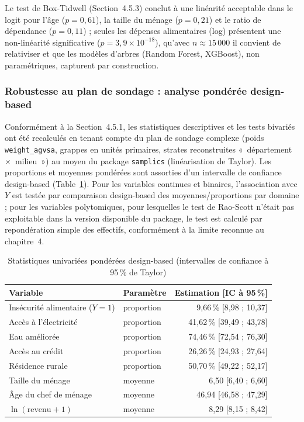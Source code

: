 Le test de Box-Tidwell (Section~4.5.3) conclut à une linéarité acceptable dans
le logit pour l'âge ($p = 0{,}61$), la taille du ménage ($p = 0{,}21$) et le
ratio de dépendance ($p = 0{,}11$) ; seules les dépenses alimentaires (log)
présentent une non-linéarité significative ($p = 3{,}9\times10^{-18}$),
qu'avec $n \approx 15\,000$ il convient de relativiser et que les modèles
d'arbres (Random Forest, XGBoost), non paramétriques, capturent par
construction.

\subsubsection{Robustesse au plan de sondage : analyse pondérée design-based}
\label{sssec:res-ponderee}

Conformément à la Section~4.5.1, les statistiques descriptives et les tests
bivariés ont été recalculés en tenant compte du plan de sondage complexe
(poids \texttt{weight\_agvsa}, grappes en unités primaires, strates
reconstruites «~département~$\times$~milieu~») au moyen du package
\texttt{samplics} (linéarisation de Taylor). Les proportions et moyennes
pondérées sont assorties d'un intervalle de confiance design-based
(Table~\ref{tab:res-pondere-uni}). Pour les variables continues et binaires,
l'association avec $Y$ est testée par comparaison design-based des
moyennes/proportions par domaine ; pour les variables polytomiques, pour
lesquelles le test de Rao-Scott n'était pas exploitable dans la version
disponible du package, le test est calculé par repondération simple des
effectifs, conformément à la limite reconnue au chapitre~4.

\begin{table}[H]
\centering
\caption{Statistiques univariées pondérées design-based (intervalles de confiance
à 95\,\% de Taylor)}
\label{tab:res-pondere-uni}
\small\setlength{\tabcolsep}{5pt}
\begin{tabular}{llr}
\toprule
\textbf{Variable} & \textbf{Paramètre} & \textbf{Estimation [IC à 95\,\%]} \\
\midrule
Insécurité alimentaire ($Y=1$) & proportion & 9,66\,\% [8,98 ; 10,37] \\
Accès à l'électricité          & proportion & 41,62\,\% [39,49 ; 43,78] \\
Eau améliorée                  & proportion & 74,46\,\% [72,54 ; 76,30] \\
Accès au crédit                & proportion & 26,26\,\% [24,93 ; 27,64] \\
Résidence rurale               & proportion & 50,70\,\% [49,22 ; 52,17] \\
Taille du ménage               & moyenne    & 6,50 [6,40 ; 6,60] \\
Âge du chef de ménage          & moyenne    & 46,94 [46,58 ; 47,29] \\
$\ln(\text{revenu}+1)$         & moyenne    & 8,29 [8,15 ; 8,42] \\
\bottomrule
\end{tabular}
\end{table}

